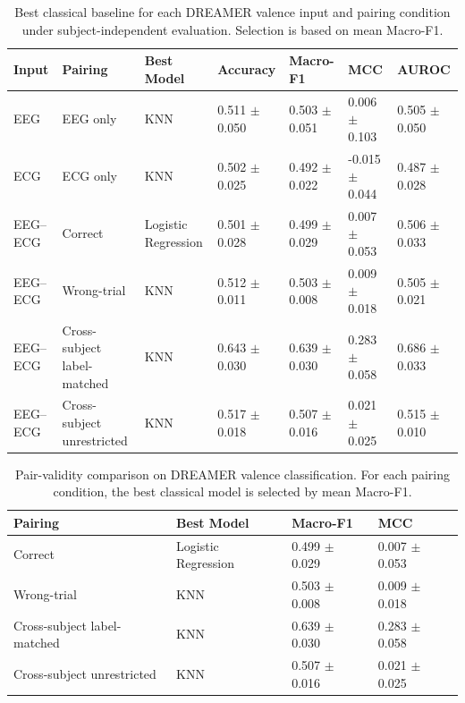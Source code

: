\begin{table}[!t]
\centering
\caption{Best classical baseline for each DREAMER valence input and pairing condition under subject-independent evaluation. Selection is based on mean Macro-F1.}
\label{tab:dreamer_valence_best_classical}
\begin{tabular}{lllllll}
\toprule
Input & Pairing & Best Model & Accuracy & Macro-F1 & MCC & AUROC \\
\midrule
EEG & EEG only & KNN & 0.511 $\pm$ 0.050 & 0.503 $\pm$ 0.051 & 0.006 $\pm$ 0.103 & 0.505 $\pm$ 0.050 \\
ECG & ECG only & KNN & 0.502 $\pm$ 0.025 & 0.492 $\pm$ 0.022 & -0.015 $\pm$ 0.044 & 0.487 $\pm$ 0.028 \\
EEG--ECG & Correct & Logistic Regression & 0.501 $\pm$ 0.028 & 0.499 $\pm$ 0.029 & 0.007 $\pm$ 0.053 & 0.506 $\pm$ 0.033 \\
EEG--ECG & Wrong-trial & KNN & 0.512 $\pm$ 0.011 & 0.503 $\pm$ 0.008 & 0.009 $\pm$ 0.018 & 0.505 $\pm$ 0.021 \\
EEG--ECG & Cross-subject label-matched & KNN & 0.643 $\pm$ 0.030 & 0.639 $\pm$ 0.030 & 0.283 $\pm$ 0.058 & 0.686 $\pm$ 0.033 \\
EEG--ECG & Cross-subject unrestricted & KNN & 0.517 $\pm$ 0.018 & 0.507 $\pm$ 0.016 & 0.021 $\pm$ 0.025 & 0.515 $\pm$ 0.010 \\
\bottomrule
\end{tabular}
\end{table}

\begin{table}[!t]
\centering
\caption{Pair-validity comparison on DREAMER valence classification. For each pairing condition, the best classical model is selected by mean Macro-F1.}
\label{tab:dreamer_valence_pair_validity}
\begin{tabular}{llll}
\toprule
Pairing & Best Model & Macro-F1 & MCC \\
\midrule
Correct & Logistic Regression & 0.499 $\pm$ 0.029 & 0.007 $\pm$ 0.053 \\
Wrong-trial & KNN & 0.503 $\pm$ 0.008 & 0.009 $\pm$ 0.018 \\
Cross-subject label-matched & KNN & 0.639 $\pm$ 0.030 & 0.283 $\pm$ 0.058 \\
Cross-subject unrestricted & KNN & 0.507 $\pm$ 0.016 & 0.021 $\pm$ 0.025 \\
\bottomrule
\end{tabular}
\end{table}

